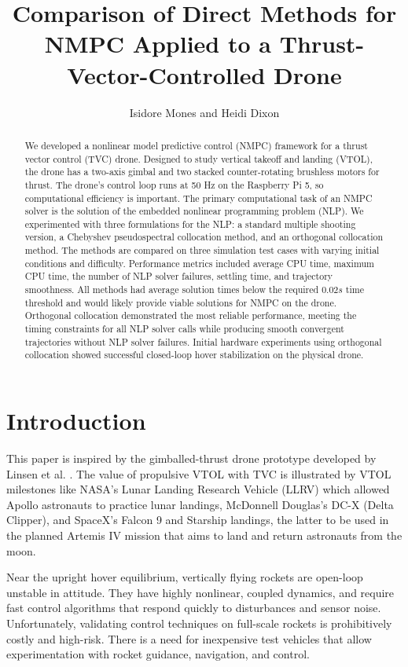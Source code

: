 \documentclass[conf]{new-aiaa}
\title{Comparison of Direct Methods for NMPC Applied to a Thrust-Vector-Controlled Drone}
\author{Isidore Mones and Heidi Dixon}
\begin{document}
\maketitle
\renewcommand{\thefootnote}{\arabic{footnote}}
\begin{abstract}
 
We developed a nonlinear model predictive control (NMPC) framework for a thrust vector control (TVC) drone. Designed to study vertical takeoff and landing (VTOL), the drone has a two-axis gimbal and two stacked counter-rotating brushless motors for thrust.
The drone's control loop runs at 50 Hz on the Raspberry Pi 5, so computational efficiency is important.
The primary computational task of an NMPC solver is the solution of the embedded nonlinear programming problem (NLP).
We experimented with three formulations for the NLP:  a standard multiple shooting version, a Chebyshev pseudospectral collocation method, and an orthogonal collocation method.  
The methods are compared on three simulation test cases with varying initial conditions and difficulty. Performance metrics included average CPU time, maximum CPU time, the number of NLP solver failures, settling time, and trajectory smoothness.
All methods had average solution times below the required $0.02s$ time threshold and would likely provide viable solutions for NMPC on the drone. 
Orthogonal collocation demonstrated the most reliable performance, meeting the timing constraints for all NLP solver calls while producing smooth convergent trajectories without NLP solver failures. Initial hardware experiments using orthogonal collocation showed successful closed-loop hover stabilization on the physical drone.


\end{abstract}
\section{Introduction}	
	
	This paper is inspired by the gimballed-thrust drone prototype developed by Linsen et al. \cite{TVCDrone}.
	The value of propulsive VTOL with TVC is illustrated by VTOL milestones like NASA's Lunar Landing Research Vehicle (LLRV) which allowed Apollo astronauts to practice lunar landings, McDonnell Douglas’s DC-X (Delta Clipper), and SpaceX's Falcon 9 and Starship landings, the latter to be used in the planned Artemis IV mission that aims to land and return astronauts from the moon.	

	Near the upright hover equilibrium, vertically flying rockets are open-loop unstable in attitude. They have highly nonlinear, coupled dynamics, and require fast control algorithms that respond quickly to disturbances and sensor noise. Unfortunately, validating control techniques on full-scale rockets is prohibitively costly and high-risk. There is a need for inexpensive test vehicles that allow experimentation with rocket guidance, navigation, and control. 
\end{document}

